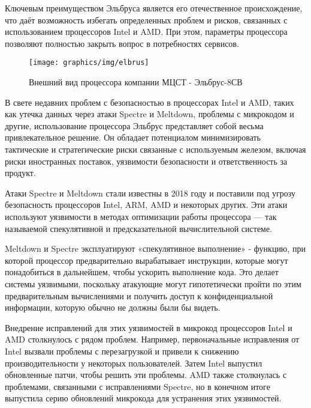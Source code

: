 
Ключевым преимуществом Эльбруса является его отечественное происхождение, что даёт возможность избегать определенных проблем и рисков, связанных с использованием процессоров Intel и AMD. При этом, параметры процессора позволяют полностью закрыть вопрос в потребностях сервисов.

\begin{figure}
  \centering
  \texttt{[image: graphics/img/elbrus]}
  \caption{Внешний вид процессора компании МЦСТ - Эльбрус-8СВ}
  \label{fig:elbrus}
\end{figure}

В свете недавних проблем с безопасностью в процессорах Intel и AMD, таких как утечка данных через атаки Spectre и Meltdown, проблемы с микрокодом и другие, использование процессора Эльбрус представляет собой весьма привлекательное решение. Он обладает потенциалом минимизировать тактические и стратегические риски связанные с используемым железом, включая риски иностранных поставок, уязвимости безопасности и ответственность за продукт.

Атаки Spectre и Meltdown стали известны в 2018 году и поставили под угрозу безопасность процессоров Intel, ARM, AMD и некоторых других. Эти атаки используют уязвимости в методах оптимизации работы процессора — так называемой спекулятивной и предсказательной вычислительной системе.

Meltdown и Spectre эксплуатируют «спекулятивное выполнение» \cite{risk:spectual_hack} - функцию, при которой процессор предварительно вырабатывает инструкции, которые могут понадобиться в дальнейшем, чтобы ускорить выполнение кода. Это делает системы уязвимыми, поскольку атакующие могут гипотетически пройти по этим предварительным вычислениями и получить доступ к конфиденциальной информации, которую обычно не должны были бы видеть.

Внедрение исправлений для этих уязвимостей в микрокод процессоров Intel и AMD столкнулось с рядом проблем. Например, первоначальные исправления от Intel вызвали проблемы с перезагрузкой и привели к снижению производительности у некоторых пользователей. Затем Intel выпустил обновленные патчи, чтобы решить эти проблемы. AMD также столкнулась с проблемами, связанными с исправлениями Spectre, но в конечном итоге выпустила серию обновлений микрокода для устранения этих уязвимостей.

